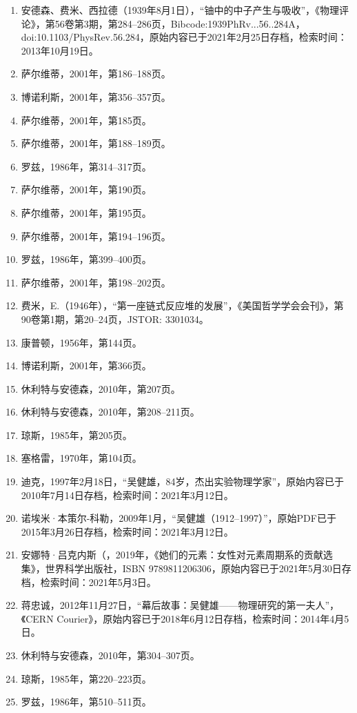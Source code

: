 \begin{enumerate}
\item 安德森、费米、西拉德（1939年8月1日），“铀中的中子产生与吸收”，《物理评论》，第56卷第3期，第284–286页，Bibcode:1939PhRv...56..284A，doi:10.1103/PhysRev.56.284，原始内容已于2021年2月25日存档，检索时间：2013年10月19日。
\item 萨尔维蒂，2001年，第186–188页。
\item 博诺利斯，2001年，第356–357页。
\item 萨尔维蒂，2001年，第185页。
\item 萨尔维蒂，2001年，第188–189页。
\item 罗兹，1986年，第314–317页。
\item 萨尔维蒂，2001年，第190页。
\item 萨尔维蒂，2001年，第195页。
\item 萨尔维蒂，2001年，第194–196页。
\item 罗兹，1986年，第399–400页。
\item 萨尔维蒂，2001年，第198–202页。
\item 费米，E.（1946年），“第一座链式反应堆的发展”，《美国哲学学会会刊》，第90卷第1期，第20–24页，JSTOR: 3301034。
\item 康普顿，1956年，第144页。
\item 博诺利斯，2001年，第366页。
\item 休利特与安德森，2010年，第207页。
\item 休利特与安德森，2010年，第208–211页。
\item 琼斯，1985年，第205页。
\item 塞格雷，1970年，第104页。
\item 迪克，1997年2月18日，“吴健雄，84岁，杰出实验物理学家”，原始内容已于2010年7月14日存档，检索时间：2021年3月12日。
\item 诺埃米·本策尔-科勒，2009年1月，“吴健雄（1912–1997）”，原始PDF已于2015年3月26日存档，检索时间：2021年3月12日。
\item 安娜特·吕克内斯（，2019年，《她们的元素：女性对元素周期系的贡献选集》，世界科学出版社，ISBN 9789811206306，原始内容已于2021年5月30日存档，检索时间：2021年5月3日。
\item 蒋忠诚，2012年11月27日，“幕后故事：吴健雄——物理研究的第一夫人”，《CERN Courier》，原始内容已于2018年6月12日存档，检索时间：2014年4月5日。
\item 休利特与安德森，2010年，第304–307页。
\item 琼斯，1985年，第220–223页。
\item 罗兹，1986年，第510–511页。

\end{enumerate}
